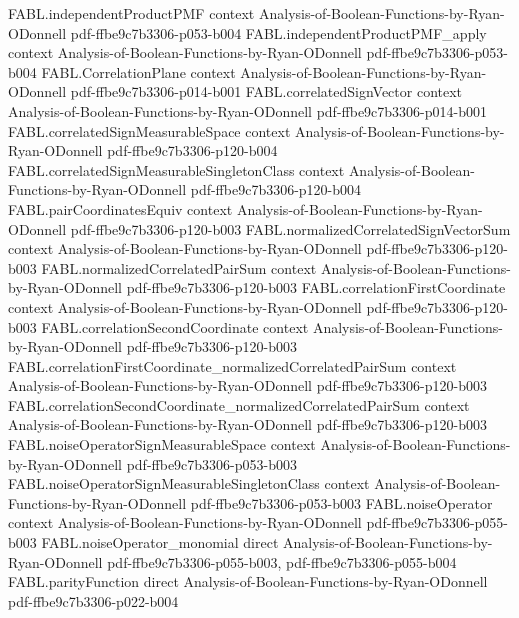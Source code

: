 \begin{theorem}
  {FABL.independentProductPMF}
  {context}
  {Analysis-of-Boolean-Functions-by-Ryan-ODonnell}
  {pdf-ffbe9c7b3306-p053-b004}
\proofstep
  {FABL.independentProductPMF_apply}
  {context}
  {Analysis-of-Boolean-Functions-by-Ryan-ODonnell}
  {pdf-ffbe9c7b3306-p053-b004}
\proofstep
  {FABL.CorrelationPlane}
  {context}
  {Analysis-of-Boolean-Functions-by-Ryan-ODonnell}
  {pdf-ffbe9c7b3306-p014-b001}
\proofstep
  {FABL.correlatedSignVector}
  {context}
  {Analysis-of-Boolean-Functions-by-Ryan-ODonnell}
  {pdf-ffbe9c7b3306-p014-b001}
\proofstep
  {FABL.correlatedSignMeasurableSpace}
  {context}
  {Analysis-of-Boolean-Functions-by-Ryan-ODonnell}
  {pdf-ffbe9c7b3306-p120-b004}
\proofstep
  {FABL.correlatedSignMeasurableSingletonClass}
  {context}
  {Analysis-of-Boolean-Functions-by-Ryan-ODonnell}
  {pdf-ffbe9c7b3306-p120-b004}
\proofstep
  {FABL.pairCoordinatesEquiv}
  {context}
  {Analysis-of-Boolean-Functions-by-Ryan-ODonnell}
  {pdf-ffbe9c7b3306-p120-b003}
\proofstep
  {FABL.normalizedCorrelatedSignVectorSum}
  {context}
  {Analysis-of-Boolean-Functions-by-Ryan-ODonnell}
  {pdf-ffbe9c7b3306-p120-b003}
\proofstep
  {FABL.normalizedCorrelatedPairSum}
  {context}
  {Analysis-of-Boolean-Functions-by-Ryan-ODonnell}
  {pdf-ffbe9c7b3306-p120-b003}
\proofstep
  {FABL.correlationFirstCoordinate}
  {context}
  {Analysis-of-Boolean-Functions-by-Ryan-ODonnell}
  {pdf-ffbe9c7b3306-p120-b003}
\proofstep
  {FABL.correlationSecondCoordinate}
  {context}
  {Analysis-of-Boolean-Functions-by-Ryan-ODonnell}
  {pdf-ffbe9c7b3306-p120-b003}
\proofstep
  {FABL.correlationFirstCoordinate_normalizedCorrelatedPairSum}
  {context}
  {Analysis-of-Boolean-Functions-by-Ryan-ODonnell}
  {pdf-ffbe9c7b3306-p120-b003}
\proofstep
  {FABL.correlationSecondCoordinate_normalizedCorrelatedPairSum}
  {context}
  {Analysis-of-Boolean-Functions-by-Ryan-ODonnell}
  {pdf-ffbe9c7b3306-p120-b003}
\proofstep
  {FABL.noiseOperatorSignMeasurableSpace}
  {context}
  {Analysis-of-Boolean-Functions-by-Ryan-ODonnell}
  {pdf-ffbe9c7b3306-p053-b003}
\proofstep
  {FABL.noiseOperatorSignMeasurableSingletonClass}
  {context}
  {Analysis-of-Boolean-Functions-by-Ryan-ODonnell}
  {pdf-ffbe9c7b3306-p053-b003}
\proofstep
  {FABL.noiseOperator}
  {context}
  {Analysis-of-Boolean-Functions-by-Ryan-ODonnell}
  {pdf-ffbe9c7b3306-p055-b003}
\proofstep
  {FABL.noiseOperator_monomial}
  {direct}
  {Analysis-of-Boolean-Functions-by-Ryan-ODonnell}
  {pdf-ffbe9c7b3306-p055-b003,
    pdf-ffbe9c7b3306-p055-b004}
\proofstep
  {FABL.parityFunction}
  {direct}
  {Analysis-of-Boolean-Functions-by-Ryan-ODonnell}
  {pdf-ffbe9c7b3306-p022-b004}

\end{theorem}

